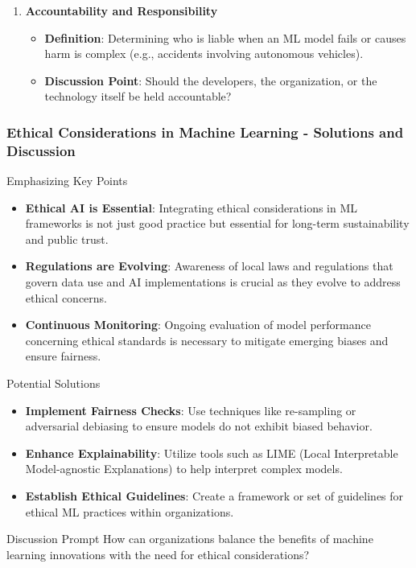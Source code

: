 \documentclass[aspectratio=169]{beamer}
\begin{document}
\begin{frame}[fragile]
\begin{enumerate}
        \item \textbf{Accountability and Responsibility}
            \begin{itemize}
                \item \textbf{Definition}: Determining who is liable when an ML model fails or causes harm is complex (e.g., accidents involving autonomous vehicles).
                \item \textbf{Discussion Point}: Should the developers, the organization, or the technology itself be held accountable?
            \end{itemize}
    \end{enumerate}
\end{frame}

\begin{frame}[fragile]
    \frametitle{Ethical Considerations in Machine Learning - Solutions and Discussion}
    \begin{block}{Emphasizing Key Points}
        \begin{itemize}
            \item \textbf{Ethical AI is Essential}: Integrating ethical considerations in ML frameworks is not just good practice but essential for long-term sustainability and public trust.
            \item \textbf{Regulations are Evolving}: Awareness of local laws and regulations that govern data use and AI implementations is crucial as they evolve to address ethical concerns.
            \item \textbf{Continuous Monitoring}: Ongoing evaluation of model performance concerning ethical standards is necessary to mitigate emerging biases and ensure fairness.
        \end{itemize}
    \end{block}

    \begin{block}{Potential Solutions}
        \begin{itemize}
            \item \textbf{Implement Fairness Checks}: Use techniques like re-sampling or adversarial debiasing to ensure models do not exhibit biased behavior.
            \item \textbf{Enhance Explainability}: Utilize tools such as LIME (Local Interpretable Model-agnostic Explanations) to help interpret complex models.
            \item \textbf{Establish Ethical Guidelines}: Create a framework or set of guidelines for ethical ML practices within organizations.
        \end{itemize}
    \end{block}

    \begin{block}{Discussion Prompt}
        How can organizations balance the benefits of machine learning innovations with the need for ethical considerations?
    \end{block}
\end{frame}
\end{document}
